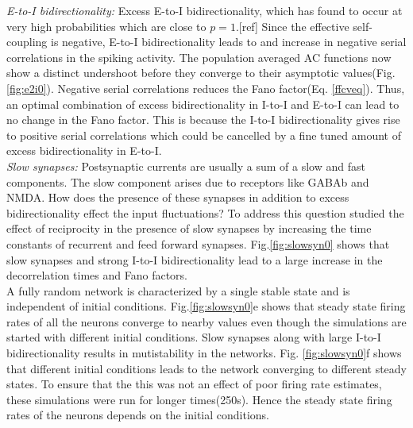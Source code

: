 \emph{E-to-I bidirectionality:} Excess E-to-I bidirectionality, which has found to occur at very high probabilities which are close to $p=1$.[ref] %
Since the effective self-coupling is negative, E-to-I bidirectionality leads to and increase in negative serial correlations in the spiking activity. The population averaged AC functions now show a distinct undershoot before they converge to their asymptotic values(Fig. \ref{fig:e2i0}). Negative serial correlations reduces the Fano factor(Eq. \ref{ffcveq}). Thus, an optimal combination of excess bidirectionality in I-to-I and E-to-I can lead to no change in the Fano factor. This is because the I-to-I bidirectionality gives rise to positive serial correlations which could be cancelled by a fine tuned amount of excess bidirectionality in E-to-I. \\
\emph{Slow synapses:} Postsynaptic currents are usually a sum of a slow and fast components. The slow component arises due to receptors like GABAb and NMDA. How does the presence of these synapses in addition to excess bidirectionality effect the input fluctuations? To address this question studied the effect of reciprocity in the presence of slow synapses by increasing the time constants of recurrent and feed forward synapses. Fig.\ref{fig:slowsyn0} shows that slow synapses and strong I-to-I bidirectionality lead to a large increase in the decorrelation times and Fano factors.\\  A fully random network is characterized by a single stable state and is independent of initial conditions. Fig.\ref{fig:slowsyn0}e shows that steady state firing rates of all the neurons converge to nearby values even though the simulations are started with different initial conditions. Slow synapses along with large I-to-I bidirectionality results in mutistability in the networks. Fig. \ref{fig:slowsyn0}f shows that different initial conditions leads to the network converging to different steady states. To ensure that the this was not an effect of poor firing rate estimates, these simulations were run for longer times(250s). Hence the steady state firing rates of the neurons depends on the initial conditions.\\

